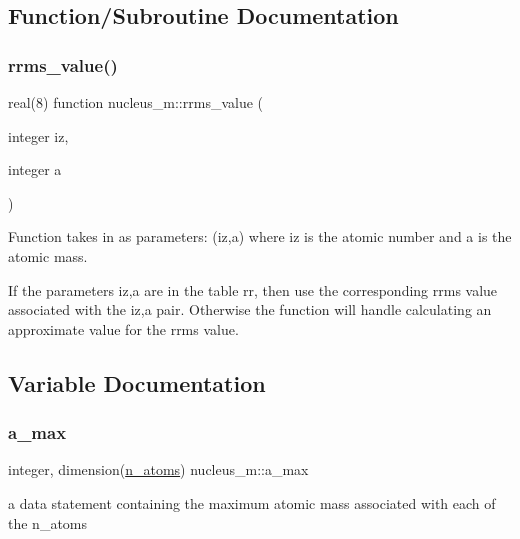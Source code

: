\subsection{Function/\+Subroutine Documentation}
\mbox{\label{namespacenucleus__m_aa70383e98e9176269442449160eaaea0}} 
\subsubsection{\texorpdfstring{rrms\_value()}{rrms\_value()}}
{\footnotesize\ttfamily real(8) function nucleus\+\_\+m\+::rrms\+\_\+value (\begin{DoxyParamCaption}\item[{integer}]{iz,  }\item[{integer}]{a }\end{DoxyParamCaption})}



Function takes in as parameters\+: (iz,a) where \textquotesingle{}iz\textquotesingle{} is the atomic number and \textquotesingle{}a\textquotesingle{} is the atomic mass. 

If the parameters iz,a are in the table rr, then use the corresponding rrms value associated with the iz,a pair. Otherwise the function will handle calculating an approximate value for the rrms value. 

\subsection{Variable Documentation}
\mbox{\label{namespacenucleus__m_ac8aa001386cf3938a2be5b5ec45d0c8d}} 
\subsubsection{\texorpdfstring{a\_max}{a\_max}}
{\footnotesize\ttfamily integer, dimension(\mbox{\hyperlink{namespacenucleus__m_a97ff520812e294bf26a6b2c330f211e5}{n\+\_\+atoms}}) nucleus\+\_\+m\+::a\+\_\+max}



a data statement containing the maximum atomic mass associated with each of the n\+\_\+atoms 

\mbox{\label{namespacenucleus__m_a8541e730d34d4c5cbb0ca885c9c5cc35}} 
